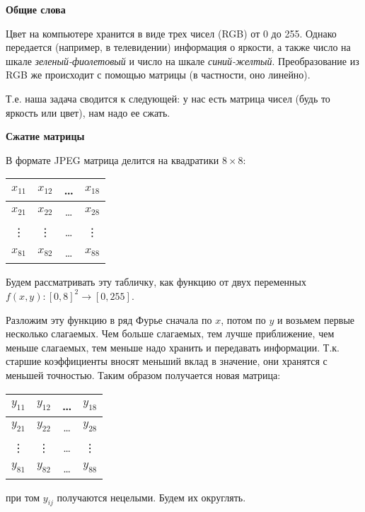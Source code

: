 \textbf{Общие слова}

Цвет на компьютере хранится в виде трех чисел (RGB) от 0 до 255. Однако
передается (например, в телевидении) информация о яркости, а также число на
шкале \textit{зеленый-фиолетовый} и число на шкале \textit{синий-желтый}.
Преобразование из RGB же происходит с помощью матрицы (в частности, оно
линейно).

Т.е. наша задача сводится к следующей: у нас есть матрица чисел (будь то яркость или цвет), нам надо ее сжать.

\noindent\textbf{Сжатие матрицы}

В формате JPEG матрица делится на квадратики $8 \times 8$:
\vspace*{1.0em}

\begin{tabular}{|c|c|c|c|}
    \hline
    $x_{11}$ & $x_{12}$ & \ldots & $x_{18}$ \\
    \hline
    $x_{21}$ & $x_{22}$ & \ldots & $x_{28}$ \\
    \hline
    \vdots   & \vdots   & \ldots & \vdots   \\
    \hline
    $x_{81}$ & $x_{82}$ & \ldots & $x_{88}$ \\
    \hline
\end{tabular}
\vspace*{1.0em}

Будем рассматривать эту табличку, как функцию от двух переменных
$f(x, y)\colon [0, 8]^2 \to [0, 255]$.

Разложим эту функцию в ряд Фурье сначала по $x$, потом по $y$ и возьмем первые
несколько слагаемых. Чем больше слагаемых, тем лучше приближение, чем меньше
слагаемых, тем меньше надо хранить и передавать информации. Т.к. старшие
коэффициенты вносят меньший вклад в значение, они хранятся с меньшей точностью.
Таким образом получается новая матрица:

\vspace*{1.0em}
\begin{tabular}{|c|c|c|c|}
    \hline
    $y_{11}$ & $y_{12}$ & \ldots & $y_{18}$ \\
    \hline
    $y_{21}$ & $y_{22}$ & \ldots & $y_{28}$ \\
    \hline
    \vdots   & \vdots   & \ldots & \vdots   \\
    \hline
    $y_{81}$ & $y_{82}$ & \ldots & $y_{88}$ \\
    \hline
\end{tabular}

при том $y_{ij}$ получаются нецелыми. Будем их округлять.
\vspace*{1.0em}

